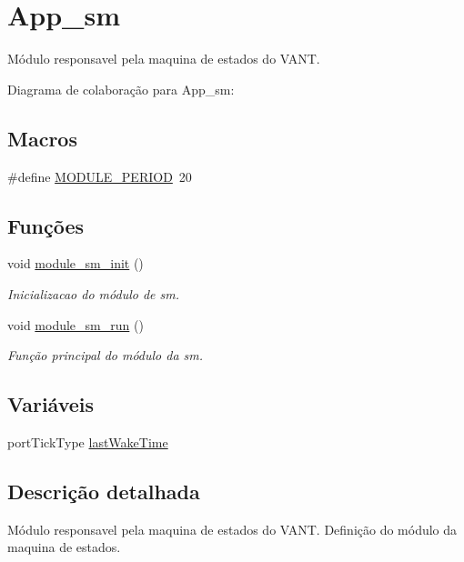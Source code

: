 \hypertarget{group__app__sm}{\section{App\-\_\-sm}
\label{group__app__sm}
}


Módulo responsavel pela maquina de estados do V\-A\-N\-T.  


Diagrama de colaboração para App\-\_\-sm\-:
\subsection*{Macros}
\begin{DoxyCompactItemize}
\item 
\#define \hyperlink{group__app__sm_ga0ac6c9f2991b096e49c354e5cce6fae0}{M\-O\-D\-U\-L\-E\-\_\-\-P\-E\-R\-I\-O\-D}~20
\end{DoxyCompactItemize}
\subsection*{Funções}
\begin{DoxyCompactItemize}
\item 
void \hyperlink{group__app__sm_gaf1b95b5ff451c9c5d9a4cdd34531201b}{module\-\_\-sm\-\_\-init} ()
\begin{DoxyCompactList}\small\item\em Inicializacao do módulo de sm. \end{DoxyCompactList}\item 
void \hyperlink{group__app__sm_ga81e54a060d460608697719ba6afab1e4}{module\-\_\-sm\-\_\-run} ()
\begin{DoxyCompactList}\small\item\em Função principal do módulo da sm. \end{DoxyCompactList}\end{DoxyCompactItemize}
\subsection*{Variáveis}
\begin{DoxyCompactItemize}
\item 
port\-Tick\-Type \hyperlink{group__app__sm_gaa8db3871cb5f64abbd94ddd5a1db73a6}{last\-Wake\-Time}
\end{DoxyCompactItemize}


\subsection{Descrição detalhada}
Módulo responsavel pela maquina de estados do V\-A\-N\-T. Definição do módulo da maquina de estados. 

